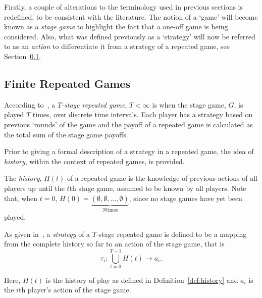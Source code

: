 Firstly, a couple of alterations to the terminology used in
previous sections is redefined, to be consistent with the
literature. The notion of a `game' will become known as a
\textit{stage game} to highlight the fact that a one-off game is being
considered. Also, what was defined previously as a `strategy' will now be
referred to as an \textit{action} to differentiate it from a strategy of a
repeated game, see Section~\ref{subsec:Finite_Repeated_Games}.

\subsection{Finite Repeated Games}\label{subsec:Finite_Repeated_Games}
According to~\cite{Knight2017}, a \textit{\(T\)-stage repeated game}, \(T <
\infty \) is when the stage game, \(G\), is played \(T\) times, over discrete
time intervals. Each player has a strategy based on previous `rounds' of
the game and the payoff of a repeated game is calculated as the total sum of the
stage game payoffs.

Prior to giving a formal description of a strategy in a repeated game, the idea
of \textit{history}, within the context of repeated games, is provided.

\begin{definition}\label{def:history}
    The \textit{history}, \(H(t)\) of a repeated game is the knowledge of
    previous actions of all players up until the \(t\)th stage game, assumed to
    be known by all players. Note that, when \(t=0\), \(H(0) =
\underbrace{(\emptyset, \emptyset, \ldots, \emptyset)}_{N \text{times}}\), since
no stage games have yet been played.
\end{definition}

\begin{definition}
    As given in~\cite{Knight2019,maschler_solan_zamir_2013}, a
    \textit{strategy} of a \(T\)-stage repeated
    game is defined to be a mapping from the complete history so far to an
    action of the stage game, that is 
    \begin{equation}
        \tau_{i} : \bigcup_{t = 0}^{T-1}{H(t)} \to a_{i}.
    \end{equation}    
\end{definition}

Here, \(H(t)\) is the history of play as defined in Definition~\ref{def:history} and
\(a_{i}\) is the \(i\)th player's action of the stage game. 

